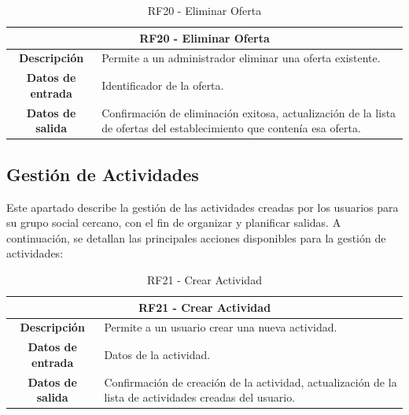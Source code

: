 \begin{table}[H]
    \centering
    \begin{tabular}{|c|p{10cm}|}
        \hline
        \multicolumn{2}{|c|}{\textbf{RF20 - Eliminar Oferta}}                                                                                              \\
        \hline
        \textbf{Descripción}      & Permite a un administrador eliminar una oferta existente.                                                              \\
        \hline
        \textbf{Datos de entrada} & Identificador de la oferta.                                                                                            \\
        \hline
        \textbf{Datos de salida}  & Confirmación de eliminación exitosa, actualización de la lista de ofertas del establecimiento que contenía esa oferta. \\
        \hline
    \end{tabular}
    \caption{RF20 - Eliminar Oferta}
\end{table}

\subsection{Gestión de Actividades}

Este apartado describe la gestión de las actividades creadas por los usuarios para su grupo social cercano, con el fin de organizar y planificar salidas. A continuación, se detallan las principales acciones disponibles para la gestión de actividades:

\begin{table}[H]
    \centering
    \begin{tabular}{|c|p{10cm}|}
        \hline
        \multicolumn{2}{|c|}{\textbf{RF21 - Crear Actividad}}                                                                               \\
        \hline
        \textbf{Descripción}      & Permite a un usuario crear una nueva actividad.                                                         \\
        \hline
        \textbf{Datos de entrada} & Datos de la actividad.                                                                                  \\
        \hline
        \textbf{Datos de salida}  & Confirmación de creación de la actividad, actualización de la lista de actividades creadas del usuario. \\
        \hline
    \end{tabular}
    \caption{RF21 - Crear Actividad}
\end{table}

